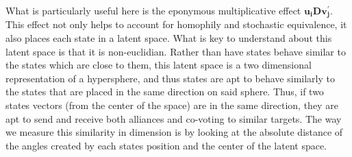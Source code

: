 What is particularly useful here is the eponymous multiplicative effect $\mathbf{u_{i}Dv^{'}_{j}}$. This effect not only helps to account for homophily and stochastic equivalence, it also places each state in a latent space. What is key to understand about this latent space is that it is non-euclidian. Rather than have states behave similar to the states which are close to them, this latent space is a two dimensional representation of a hypersphere, and thus states are apt to behave similarly to the states that are placed in the same direction on said sphere. Thus, if two states vectors (from the center of the space) are in the same direction, they are apt to send and receive both alliances and co-voting to similar targets. The way we measure this similarity in dimension is by looking at the absolute distance of the angles created by each states position and the center of the latent space. 



